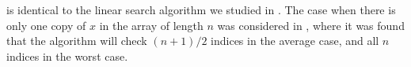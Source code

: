  is identical to the linear search algorithm we studied in .
The case when there is only one copy of $x$ in the array of length $n$ was considered in , where it was found that the algorithm will check $(n+1)/2$ indices in the average case, and all $n$ indices in the worst case.
